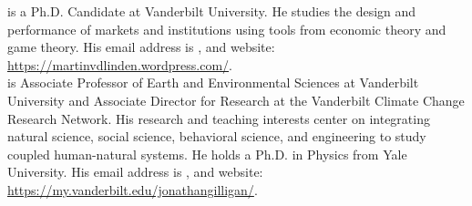 \documentclass{wscpaperproc}\usepackage[]{graphicx}\usepackage[]{color}
\begin{document}
 is a Ph.D. Candidate at Vanderbilt University. He studies the design and performance of markets and institutions using tools from economic theory and game theory.
His email address is , and website: \href{https://martinvdlinden.wordpress.com/}{https://martinvdlinden.wordpress.com/}.\\

 is Associate Professor of Earth and Environmental Sciences at Vanderbilt University and Associate Director for Research at the Vanderbilt Climate Change Research Network. His research and teaching interests center on integrating natural science, social science, behavioral science, and engineering to study coupled human-natural systems. He holds a  Ph.D. in Physics from Yale University. His email address is , and website: \href{https://my.vanderbilt.edu/jonathangilligan/}{https://my.vanderbilt.edu/jonathangilligan/}.
\end{document}
